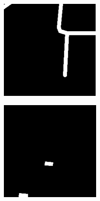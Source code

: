 \begin{figure}[H]
\begin{subfigure}[b]{0.4\linewidth}
            \caption{}
            \label{fig:results:airtiler_output_building}
    \vspace{4ex}
  \end{subfigure} 
  \begin{subfigure}[b]{0.4\linewidth}
    \centering
            \includegraphics[width=0.9\linewidth]{chapters/theoretical_and_experimental_results/images/18_138079_170377_highway.png}
            \caption{}
            \label{fig:results:airtiler_output_highway}
  \end{subfigure}%
  \begin{subfigure}[b]{0.4\linewidth}
    \centering
    \includegraphics[width=0.9\linewidth]{chapters/theoretical_and_experimental_results/images/18_138079_170377_swimming_pool.png} 

\end{subfigure}
\end{figure}
